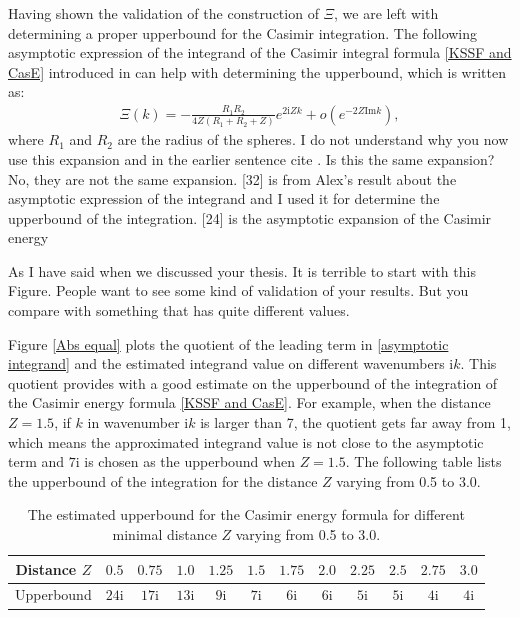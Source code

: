 {\color{teal} Having shown the validation of the construction of $\Xi$, we are left with determining a proper upperbound for the Casimir integration. 
The following asymptotic expression of the integrand of the Casimir integral formula \eqref{KSSF and CasE} introduced in \cite{fang2021singularity}
can help with determining the upperbound, which is written as:}
\begin{align}\label{asymptotic integrand}
    \Xi(k) = -\frac{R_{1}R_{2}}{4Z(R_{1} + R_{2} + Z)}e^{2\mathrm{i}Zk} + o\left(e^{-2Z\text{Im}k}\right),
\end{align}
where $R_{1}$ and $R_{2}$ are the radius of the spheres.
{\color{red} I do not understand why you now use this expansion and in the earlier sentence cite \cite{emig2008casimir}. Is this the same expansion?} {\color{teal} 
No, they are not the same expansion. [32] is from Alex's result about the asymptotic expression of the integrand and I used it for determine the upperbound of 
the integration. [24] is the asymptotic expansion of the Casimir energy}

{\color{red} As I have said when we discussed your thesis. It is terrible to start with this Figure. People want to see some kind of validation of your results.
But you compare with something that has quite different values.}

Figure \ref{Abs equal} plots the quotient of the leading term in \eqref{asymptotic integrand} and the estimated integrand value on different 
wavenumbers $\mathrm{i}k$. This quotient provides with a good estimate on the upperbound of the integration of the Casimir energy formula \eqref{KSSF and CasE}. 
For example, when the distance $Z = 1.5$, if $k$ in wavenumber $\mathrm{i}k$ is larger than 7, the quotient gets far away from 1, which means the approximated 
integrand value is not close to the asymptotic term and $7\mathrm{i}$ is chosen as the upperbound when $Z = 1.5$. The following table lists the upperbound 
of the integration for the distance $Z$ varying from 0.5 to 3.0.

\begin{table}[H]
    \centering
    \begin{tabular}{ |c|c|c|c|c|c|c|c|c|c|c|c| }
        \hline
        Distance $Z$ & $ 0.5$ & $ 0.75$  & $ 1.0$ & $1.25$ & $ 1.5$ & $1.75$  & $2.0$ & $2.25$ & $ 2.5$ & $ 2.75$  & $3.0$ \\\hline
        Upperbound & $24\mathrm{i}$ & $17\mathrm{i}$ & $13\mathrm{i}$ & $9\mathrm{i}$ & $7\mathrm{i}$ & $6\mathrm{i}$ & $6\mathrm{i}$ & $5\mathrm{i}$ & $5\mathrm{i}$ & $4\mathrm{i}$ & $4\mathrm{i}$ \\\hline
       \end{tabular}
       \caption{\label{Equal: distance and upperbound} The estimated upperbound for the Casimir energy formula for different minimal distance $Z$ varying from 
       0.5 to 3.0.}
\end{table}
 

